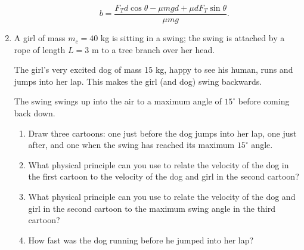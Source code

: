 \documentclass[12pt]{article}
\begin{document}
\begin{enumerate}
\begin{enumerate}
	$$b=\frac{F_T d \cos \theta - \mu mgd + \mu d F_T \sin \theta}{\mu mg}.$$
	
\end{enumerate}

\item A girl of mass $m_c = 40$ kg is sitting in a swing; the swing is attached by a rope of length $L=3$ m to a tree branch over her head.

The girl's very excited dog of mass 15 kg, happy to see his human, runs and jumps into her lap. This makes the girl (and dog) swing backwards.

The swing swings up into the air to a maximum angle of $15^\circ$ before coming back down.

\begin{enumerate}
	\item Draw three cartoons: one just before the dog jumps into her lap, one just after, and one when the swing has reached its maximum $15^\circ$ angle.
	\item What physical principle can you use to relate the velocity of the dog in the first cartoon to the velocity of the dog and girl in the second cartoon?
	\item What physical principle can you use to relate the velocity of the dog and girl in the second cartoon to the maximum swing angle in the third cartoon?
\item How fast was the dog running before he jumped into her lap? 
\end{enumerate}

\bigskip







\end{enumerate}
\end{document}
